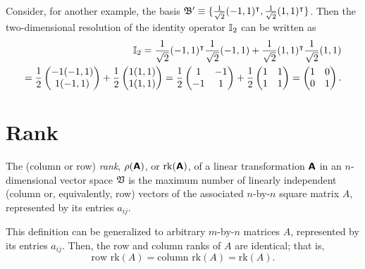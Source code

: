 {Consider, for another example, the basis
${\frak B}' \equiv \{\frac{1}{\sqrt{2}}(-1,1)^\intercal ,\frac{1}{\sqrt{2}}(1,1)^\intercal \}$.
Then the two-dimensional resolution of the identity operator ${\Bbb I}_2$
can be written as
\begin{equation}
\begin{split}
{\Bbb I}_2 =  \frac{1}{\sqrt{2}}   (-1,1)^\intercal   \frac{1}{\sqrt{2}}(-1,1) +   \frac{1}{\sqrt{2}}(1,1)^\intercal  \frac{1}{\sqrt{2}}(1,1)
\\
=
\frac{1}{{2}}
\begin{pmatrix}
-1 (-1,1) \\  1 (-1,1)
\end{pmatrix}
 +
\frac{1}{{2}}
\begin{pmatrix}
1 (1,1)\\
1 (1,1)
\end{pmatrix}
 =
\frac{1}{{2}}
\begin{pmatrix}
1 & -1 \\
-1 & 1
\end{pmatrix}
+
\frac{1}{{2}}
\begin{pmatrix}
1 & 1 \\
1 & 1
\end{pmatrix}
=
\begin{pmatrix}
1 & 0 \\
0 & 1
\end{pmatrix}
.
\end{split}
\end{equation}


\eexample
}


\section{Rank}
\label{2014-m-fdvs-rank}

The (column or row) {\em rank}, $\rho (  \textsf{\textbf{A}}  )$,
or $\textrm{rk} ( \textsf{\textbf{A}} )$,
of a linear transformation $ \textsf{\textbf{A}} $
in an $n$-dimensional vector space ${\frak V}$
is the maximum number of linearly independent (column or, equivalently,
row) vectors of the associated
$n$-by-$n$ square matrix $ A $, represented by its entries  $a_{ij}$.

This definition can be generalized to arbitrary
$m$-by-$n$ matrices $A$, represented by its entries  $a_{ij}$.
Then, the row and column ranks of $A$ are identical; that is,
\begin{equation}
\textrm{row rk} (A) =
\textrm{column rk} (A)  =
\textrm{rk} (A).
\end{equation}


